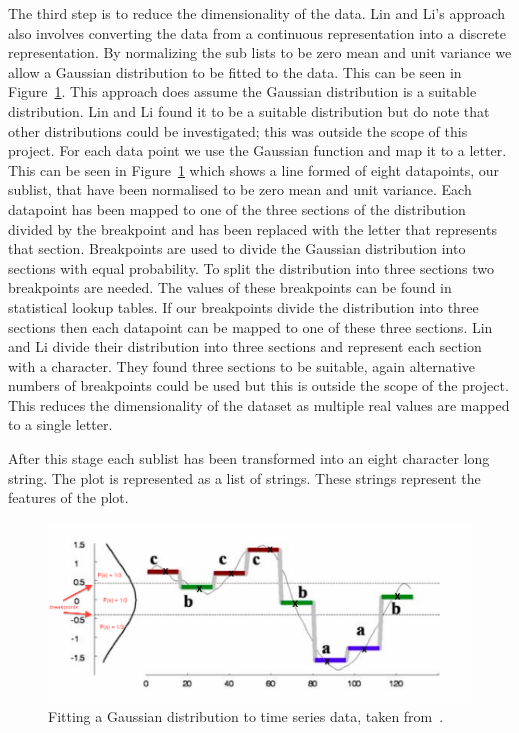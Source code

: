 The third step is to reduce the dimensionality of the data.  Lin and Li's approach also involves converting the data from a continuous representation into a discrete representation.  By normalizing the sub lists to be zero mean and unit variance we allow a Gaussian distribution to be fitted to the data.  This can be seen in Figure~\ref{fig:gaussian_plot}.  This approach does assume the Gaussian distribution is a suitable distribution.  Lin and Li found it to be a suitable distribution but do note that other distributions could be investigated; this was outside the scope of this project.  For each data point we use the Gaussian function and map it to a letter.  This can be seen in Figure~\ref{fig:gaussian_plot} which shows a line formed of eight datapoints, our sublist, that have been normalised to be zero mean and unit variance.  Each datapoint has been mapped to one of the three sections of the distribution divided by the breakpoint and has been replaced with the letter that represents that section.  Breakpoints are used to divide the Gaussian distribution into sections with equal probability.  To split the distribution into three sections two breakpoints are needed. The values of these breakpoints can be found in statistical lookup tables.  If our breakpoints divide the distribution into three sections then each datapoint can be mapped to one of these three sections.  Lin and Li divide their distribution into three sections and represent each section with a character.  They found three sections to be suitable, again alternative numbers of breakpoints could be used but this is outside the scope of the project.  This reduces the dimensionality of the dataset as multiple real values are mapped to a single letter.

After this stage each sublist has been transformed into an eight character long string.  The plot is represented as a list of strings.  These strings represent the features of the plot.

\begin{figure}[h!]
    \centering
    \includegraphics[width=\textwidth]{images/similiarty_normalise.png}
    \caption{Fitting a Gaussian distribution to time series data, taken from~\cite{structural_similarity}.}
    \label{fig:gaussian_plot}
\end{figure}

